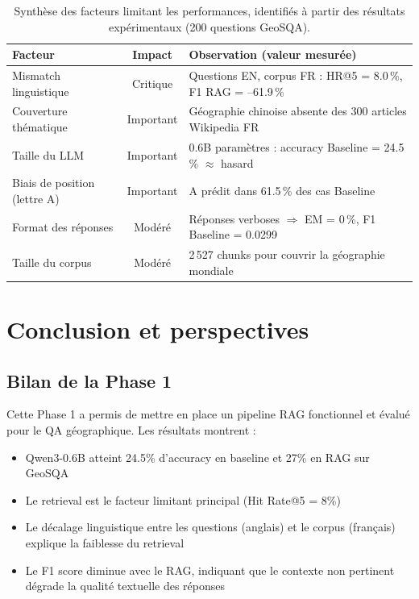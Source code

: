 \documentclass[12pt,a4paper]{article}
\begin{document}
\begin{table}[H]
\centering
\caption{Synthèse des facteurs limitant les performances, identifiés à partir
  des résultats expérimentaux (200 questions GeoSQA).}
\label{tab:facteurs}
\begin{tabularx}{\textwidth}{@{} l c X @{}}
\toprule
\textbf{Facteur} & \textbf{Impact} & \textbf{Observation (valeur mesurée)} \\
\midrule
Mismatch linguistique
  & \cellcolor{criticalred!20}Critique
  & Questions EN, corpus FR : HR@5 = 8.0\,\%, F1 RAG = --61.9\,\% \\
\rowcolor{lightgray}
Couverture thématique
  & \cellcolor{importantyellow!30}Important
  & Géographie chinoise absente des 300 articles Wikipedia FR \\
Taille du LLM
  & \cellcolor{importantyellow!30}Important
  & 0.6B paramètres : accuracy Baseline = 24.5\,\% $\approx$ hasard \\
\rowcolor{lightgray}
Biais de position (lettre A)
  & \cellcolor{importantyellow!30}Important
  & A prédit dans 61.5\,\% des cas Baseline \\
Format des réponses
  & \cellcolor{moderategray!20}Modéré
  & Réponses verboses $\Rightarrow$ EM = 0\,\%, F1 Baseline = 0.0299 \\
\rowcolor{lightgray}
Taille du corpus
  & \cellcolor{moderategray!20}Modéré
  & 2\,527 chunks pour couvrir la géographie mondiale \\
\bottomrule
\end{tabularx}
\end{table}

\section{Conclusion et perspectives}
\label{sec:conclusion}

\subsection{Bilan de la Phase 1}

Cette Phase 1 a permis de mettre en place un pipeline RAG fonctionnel et évalué pour le QA géographique. Les résultats montrent :

\begin{itemize}[leftmargin=*]
  \item Qwen3-0.6B atteint 24.5\% d'accuracy en baseline et 27\% en RAG sur GeoSQA
  \item Le retrieval est le facteur limitant principal (Hit Rate@5 = 8\%)
  \item Le décalage linguistique entre les questions (anglais) et le corpus (français) explique la faiblesse du retrieval
  \item Le F1 score diminue avec le RAG, indiquant que le contexte non pertinent dégrade la qualité textuelle des réponses
\end{itemize}
\end{document}
